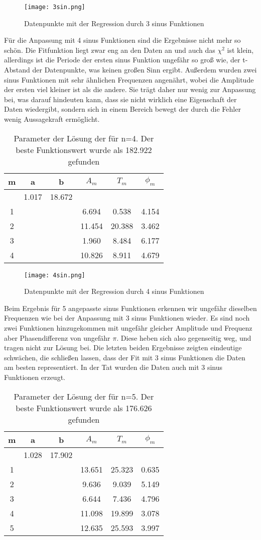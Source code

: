 \documentclass[12pt]{article}
\begin{document}
\begin{figure}[H]\centering\texttt{[image: 3sin.png]}\caption{Datenpunkte mit der Regression durch 3 sinus Funktionen}\end{figure}

Für die Anpassung mit 4 sinus Funktionen sind die Ergebnisse nicht mehr so schön. Die Fitfunktion liegt zwar eng an den Daten an und auch das $\chi^2$ ist klein, allerdings ist die Periode der ersten sinus Funktion ungefähr so groß wie, der t-Abstand der Datenpunkte, was keinen großen Sinn ergibt. Außerdem wurden zwei sinus Funktionen mit sehr ähnlichen Frequenzen angenährt, wobei die Amplitude der ersten viel kleiner ist als die andere. Sie trägt daher nur wenig zur Anpassung bei, was darauf hindeuten kann, dass sie nicht wirklich eine Eigenschaft der Daten wiedergibt, sondern sich in einem Bereich bewegt der durch die Fehler wenig Aussagekraft ermöglicht.
\begin{table}[H]\centering\begin{tabular}{|c|c|c|c|c|c|}\hline
    m&a&b&$A_m$&$T_m$&$\phi_m$\\\hline\hline
    &1.017&18.672&&&\\
1&&&6.694&0.538&4.154\\
2&&&11.454&20.388&3.462\\
3&&&1.960&8.484&6.177\\
4&&&10.826&8.911&4.679\\
\hline
\end{tabular}\caption{Parameter der Lösung der für n=4. Der beste Funktionswert wurde als 182.922 gefunden}\end{table}
\begin{figure}[H]\centering\texttt{[image: 4sin.png]}\caption{Datenpunkte mit der Regression durch 4 sinus Funktionen}\end{figure}
Beim Ergebnis für 5 angepasste sinus Funktionen erkennen wir ungefähr dieselben Frequenzen wie bei der Anpassung mit 3 sinus Funktionen wieder. Es sind noch zwei Funktionen hinzugekommen mit ungefähr gleicher Amplitude und Frequenz aber Phasendifferenz von ungefähr $\pi$. Diese heben sich also gegenseitig weg, und tragen nicht zur Lösung bei. Die letzten beiden Ergebnisse zeigten eindeutige schwächen, die schließen lassen, dass der Fit mit 3 sinus Funktionen die Daten am besten representiert. In der Tat wurden die Daten auch mit 3 sinus Funktionen erzeugt.
\begin{table}[H]\centering\begin{tabular}{|c|c|c|c|c|c|}\hline
    m&a&b&$A_m$&$T_m$&$\phi_m$\\\hline\hline
    &1.028&17.902&&&\\
1&&&13.651&25.323&0.635\\
2&&&9.636&9.039&5.149\\
3&&&6.644&7.436&4.796\\
4&&&11.098&19.899&3.078\\
5&&&12.635&25.593&3.997\\\hline
\end{tabular}\caption{Parameter der Lösung der für n=5. Der beste Funktionswert wurde als 176.626 gefunden}\end{table}
\end{document}
